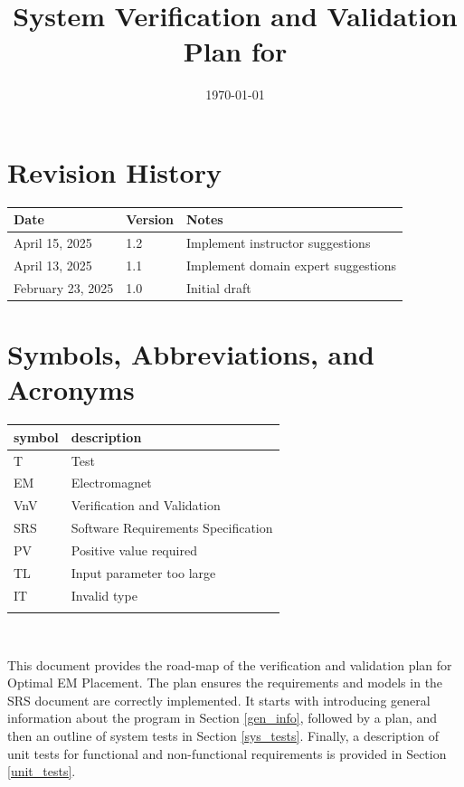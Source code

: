 \documentclass[12pt, titlepage]{article}
\begin{document}
\title{System Verification and Validation Plan for \progname{}} 
\author{\authname}
\date{\today}
	
\maketitle


\section*{Revision History}

\begin{tabularx}{\textwidth}{p{3.5cm}p{2cm}X}
\toprule {\bf Date} & {\bf Version} & {\bf Notes}\\
\midrule
April 15, 2025 & 1.2 & Implement  instructor suggestions\\
\midrule
April 13, 2025 & 1.1 & Implement domain expert suggestions\\
\midrule
February 23, 2025 & 1.0 & Initial draft\\
\bottomrule
\end{tabularx}


\newpage

\tableofcontents
\newpage

\section{Symbols, Abbreviations, and Acronyms}

\renewcommand{\arraystretch}{1.2}
\begin{tabular}{l l} 
  \toprule		
  \textbf{symbol} & \textbf{description}\\
  \midrule 
  T & Test\\
  EM & Electromagnet\\
  VnV & Verification and Validation \\
  SRS & Software Requirements Specification \\
  PV & Positive value required \\
  TL & Input parameter too large \\
  IT & Invalid type \\
  \bottomrule
  \label{abbrevs}
\end{tabular}\\

\newpage


This document provides the road-map of the verification and validation plan for Optimal EM Placement. The plan ensures the requirements and models in the SRS document are correctly implemented. It starts with introducing general information about the program in Section \ref{gen_info}, followed by a plan, and then an outline of system tests in Section \ref{sys_tests}. Finally, a description of unit tests for functional and non-functional requirements is provided in Section \ref{unit_tests}.
\end{document}
